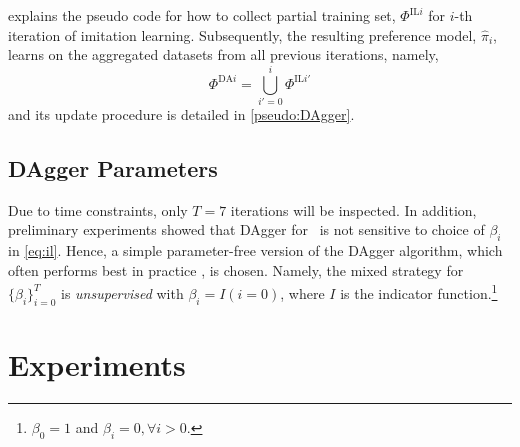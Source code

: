 \documentclass[smallextended]{svjour3}
\begin{document}

 explains the pseudo code for how to collect 
partial training set, $\Phi^{\text{IL}i}$ for $i$-th iteration of imitation 
learning.
Subsequently, the resulting preference model, $\hat{\pi}_i$, learns on the 
aggregated datasets from all previous iterations, namely,  
\begin{equation}\label{eq:DAgger}
\Phi^{\text{DA}i}=\bigcup_{i'=0}^{i}\Phi^{\text{IL}i'}
\end{equation}
and its update procedure is detailed in \cref{pseudo:DAgger}.

\subsection*{DAgger Parameters}
Due to time constraints, only $T=7$ iterations will be inspected.
In addition, preliminary experiments showed that DAgger for \jsp\ is not 
sensitive to choice of $\beta_i$ in \cref{eq:il}. 
Hence, a simple parameter-free version of the DAgger algorithm, which often 
performs best in practice \cite{RossGB11}, is chosen. 
Namely, the mixed strategy for $\{\beta_i\}_{i=0}^T$ is \emph{unsupervised} 
with $\beta_i=I(i=0)$, where $I$ is the indicator 
function.\footnote{$\beta_0=1$ and $\beta_i=0,\forall i>0$.}





\section{Experiments}\label{sec:expr}

\end{document}
